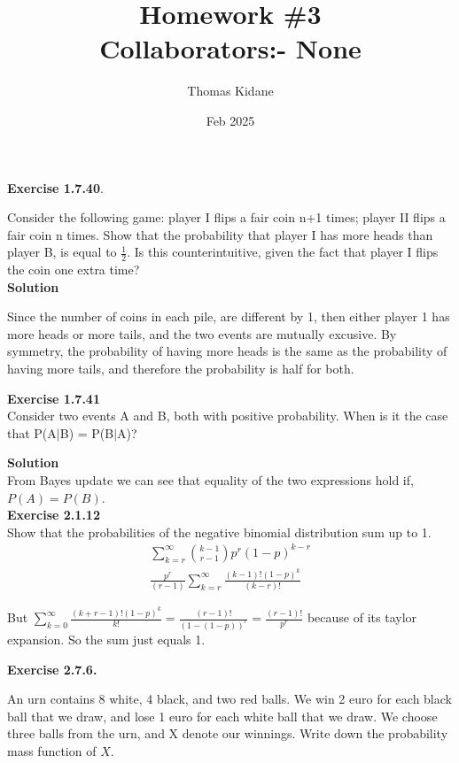 \documentclass{article}
\title{Homework \#3\\ \small Collaborators:- None}
\author{Thomas Kidane}
\date{Feb 2025}
\begin{document}
\maketitle


\textbf{Exercise 1.7.40}.

Consider the following game: player I flips a fair coin n+1 times;
player II flips a fair coin n times. Show that the probability that player I has more
heads than player B, is equal to $ \frac{1}{2}$. Is this counterintuitive, given the fact that
player I flips the coin one extra time?
\\

\textbf{Solution}

Since the number of coins in each pile, are different by 1, then either player 1 has more heads 
or more tails, and the two events are mutually excusive. By symmetry, the probability of having 
more heads is the same as the probability of having more tails, and therefore the probability is
half for both.

\textbf{Exercise 1.7.41}\\
Consider two events A and B, both with positive probability.
When is it the case that P(A$\vert$B) = P(B$\vert$A)?

\textbf{Solution}\\
From Bayes update we can see that equality of the two expressions hold if, $P(A)=P(B)$.\\

\textbf{Exercise 2.1.12}\\ Show that the probabilities of the negative binomial distribution sum up to 1.
\\

\begin{align}
    \sum_{k = r}^{\infty} \binom{k-1}{r-1} p^r (1-p)^{k-r} \\
    \frac{p^r}{(r-1)} \sum_{k=r}^{\infty} \frac{(k-1)! (1-p)^k}{(k-r)!}
\end{align}

But $\sum_{k=0}^{\infty} \frac{(k+r-1)! (1-p)^{k}}{k!} = \frac{(r-1)!}{(1-(1-p))^r} = \frac{(r-1)!}{p^r}$ because
of its taylor expansion. So the sum just equals 1.
\pagebreak

\textbf{Exercise 2.7.6. }

An urn contains 8 white, 4 black, and two red balls. We win 2 euro
for each black ball that we draw, and lose 1 euro for each white ball that we draw.
We choose three balls from the urn, and X denote our winnings. Write down the
probability mass function of $X$.\\
\end{document}
